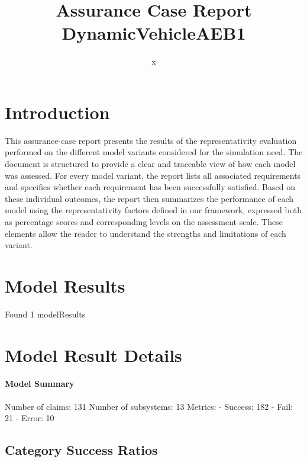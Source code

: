 \documentclass{article}
\title{Assurance Case Report DynamicVehicleAEB1}
\author{x}
\begin{document}
	\maketitle
	\section{Introduction}
	This assurance-case report presents the results of the 
	representativity evaluation performed on the different model variants considered for 
	the simulation need. The document is structured to provide a clear and traceable view of how 
	each model was assessed. For every model variant, the report lists all associated requirements
	 and specifies whether each requirement has been successfully satisfied. Based on these 
	individual outcomes, the report then summarizes the performance of each model using the 
	representativity factors defined in our framework, expressed both as percentage scores 
	and corresponding levels on the assessment scale. These elements allow the reader to understand 
	the strengths and limitations of each variant.
	 
	\section{Model Results}
    Found 1 modelResults
		
			\section{Model Result Details} 
			\paragraph{Model Summary}
			Number of claims: 131
			Number of subsystems: 13
			Metrics:
			- Success: 182
			- Fail: 21
			- Error: 10
			
	

					\subsection{Category Success Ratios}
						
\end{document}
